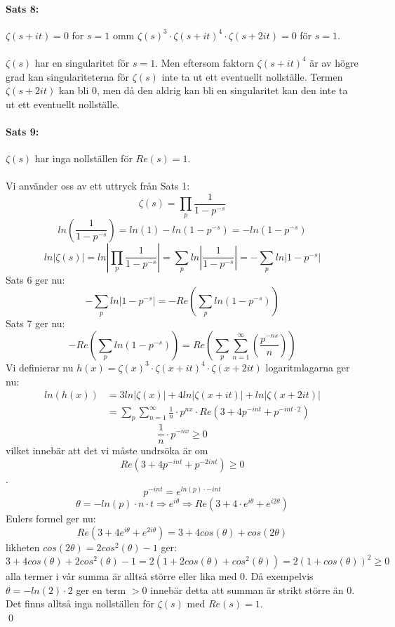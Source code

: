 \documentclass{article}%
\begin{document}
\paragraph{Sats 8:} $\zeta(s + it) = 0$ for $s = 1$ omm $\zeta(s)^3 \cdot \zeta(s + it)^4 \cdot \zeta(s + 2it) = 0$
för $s = 1$. \\
\\
$\zeta(s)$ har en singularitet för $s = 1$. Men eftersom faktorn $\zeta(s + it)^4$ är av högre grad kan singulariteterna
för $\zeta(s)$ inte ta ut ett eventuellt nollställe. Termen $\zeta(s + 2it)$ kan bli $0$, men då den aldrig kan bli en 
singularitet kan den inte ta ut ett eventuellt nollställe.\\

\newcommand*{\ps}{1 - p^{-s}}
\paragraph{Sats 9:} $\zeta(s)$ har inga nollställen för $Re(s) = 1$. \\
\\
Vi använder oss av ett uttryck från Sats 1:
$$\zeta(s) = \prod_p \frac 1 {1 - p^{-s}}$$
$$ln(\frac 1 {1 - p^{-s}}) = ln(1) - ln(1 - p^{-s}) = -ln(1 - p^{-s})$$
\[ ln \left | \zeta(s) \right| = ln \left |\prod_p \frac 1 {1 - p^{-s}} \right |
	= \sum_p ln \left | \frac 1 {1 - p^{-s}} \right | = - \sum_p ln \left |1 - p^{-s} \right | \]
Sats 6 ger nu:
\[-\sum_p ln \left | \ps \right | = - Re(\sum_p ln(\ps)) \]
Sats 7 ger nu:
$$-Re(\sum_p ln(\ps)) = Re(\sum_p \sum_{n = 1}^\infty(\frac {p^{-ns}} n))$$
Vi definierar nu $h(x) = \zeta(x)^3 \cdot \zeta(x + it)^4 \cdot \zeta(x + 2it)$ logaritmlagarna ger nu:
\begin{align*}
	ln(h(x)) &= 3 ln \left | \zeta(x) \right | + 4 ln \left | \zeta(x + it) \right | + ln \left | \zeta(x + 2it) \right |\\  
			 &= \sum_p \sum_{n = 1}^\infty \frac 1 n \cdot p^{nx} \cdot Re(3 + 4p^{-int} + p^{-int \cdot 2}) 
\end{align*}
$$\frac 1 n \cdot p^{-nx} \ge 0$$
vilket innebär att det vi måste undrsöka är om \\
$$Re(3 + 4p^{-int} + p^{-2int}) \ge 0$$.
\\
$$p^{-int} = e^{ln(p) \cdot -int}$$
$$\theta = -ln(p) \cdot n \cdot t \Rightarrow e^{i\theta} \Rightarrow Re(3 + 4 \cdot e^{i\theta} + e^{i2\theta})$$
Eulers formel ger nu:
$$Re(3 + 4e^{i\theta} + e^{2i\theta}) = 3 + 4cos(\theta) + cos(2\theta)$$
likheten $cos(2\theta) = 2cos^2(\theta) - 1$ ger:
$$3 + 4 cos(\theta) + 2 cos^2(\theta) - 1 = 2(1 + 2cos(\theta) + cos^2(\theta)) = 2(1 + cos(\theta))^2 \ge 0$$
alla termer i vår summa är alltså större eller lika med 0. Då exempelvis\\
$\theta = -ln(2) \cdot 2$ ger en term $ > 0$ innebär detta att summan är strikt större än 0.\\
Det finns alltså inga nollställen för $\zeta(s)$ med $Re(s) = 1$.\\
\hfill \qed
\end{document}
